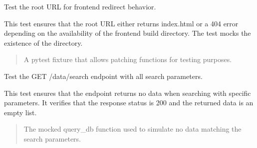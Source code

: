 \documentclass[letterpaper,10pt,english]{sphinxmanual}
\begin{document}

\begin{fulllineitems}
\label{\detokenize{test.my_fastapi:test.my_fastapi.test_main.test_root_frontend_redirect}}
\pysigstartsignatures
\pysiglinewithargsret
{}
{}
{}
\pysigstopsignatures
\sphinxAtStartPar
Test the root URL for frontend redirect behavior.

\sphinxAtStartPar
This test ensures that the root URL either returns index.html or a 404 error depending on the
availability of the frontend build directory. The test mocks the existence of the directory.
\begin{quote}\begin{description}
\sphinxAtStartPar
{} \textendash{} A pytest fixture that allows patching functions for testing purposes.

\end{description}\end{quote}

\end{fulllineitems}


\begin{fulllineitems}
\label{\detokenize{test.my_fastapi:test.my_fastapi.test_main.test_search_data_all_params}}
\pysigstartsignatures
\pysiglinewithargsret
{}
{}
{}
\pysigstopsignatures
\sphinxAtStartPar
Test the GET /data/search endpoint with all search parameters.

\sphinxAtStartPar
This test ensures that the endpoint returns no data when searching with specific parameters.
It verifies that the response status is 200 and the returned data is an empty list.
\begin{quote}\begin{description}
\sphinxAtStartPar
{} \textendash{} The mocked query\_db function used to simulate no data matching the search parameters.

\end{description}\end{quote}

\end{fulllineitems}
\end{document}
